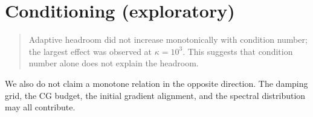 \section{Conditioning (exploratory)}
\label{sec:conditioning}

\begin{table}[t]
  \centering
  
  \caption{ by spec, $n = 10$ each. Exploratory: the specs were not
  designed as a factorial study of the condition number.}
  \label{tab:conditioning}
\end{table}

\begin{quote}
Adaptive headroom did not increase monotonically with condition number; the largest
effect was observed at $\kappa = 10^3$. This suggests that condition number alone
does not explain the headroom.
\end{quote}

We also do not claim a monotone relation in the opposite direction. The damping
grid, the CG budget, the initial gradient alignment, and the spectral distribution
may all contribute.
